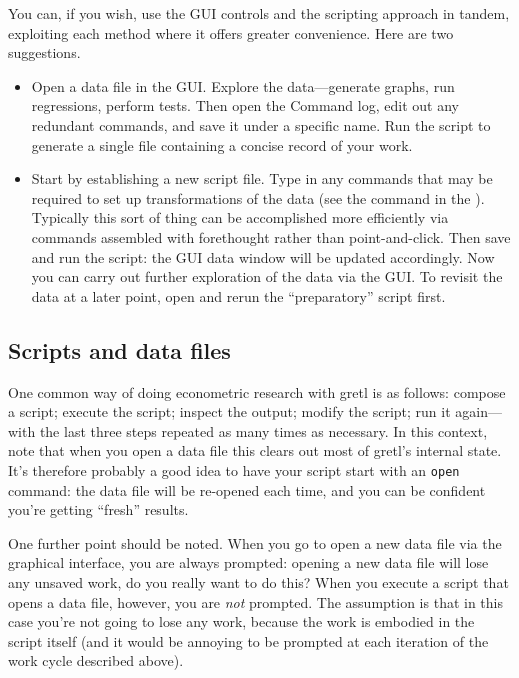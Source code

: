 You can, if you wish, use the GUI controls and the scripting approach
in tandem, exploiting each method where it offers greater convenience.
Here are two suggestions.

\begin{itemize}
\item Open a data file in the GUI.  Explore the data---generate
  graphs, run regressions, perform tests.  Then open the Command log,
  edit out any redundant commands, and save it under a specific name.
  Run the script to generate a single file containing a concise record
  of your work.
\item Start by establishing a new script file.  Type in any commands
  that may be required to set up transformations of the data (see the
   command in the \GCR). Typically this sort of thing can be
  accomplished more efficiently via commands assembled with
  forethought rather than point-and-click. Then save and run the
  script: the GUI data window will be updated accordingly.  Now you
  can carry out further exploration of the data via the GUI.  To
  revisit the data at a later point, open and rerun the
  ``preparatory'' script first.
\end{itemize}

\subsection{Scripts and data files}

One common way of doing econometric research with gretl is as follows:
compose a script; execute the script; inspect the output; modify the
script; run it again---with the last three steps repeated as many
times as necessary.  In this context, note that when you open a data
file this clears out most of gretl's internal state.  It's therefore
probably a good idea to have your script start with an \texttt{open}
command: the data file will be re-opened each time, and you can be
confident you're getting ``fresh'' results.

One further point should be noted.  When you go to open a new data
file via the graphical interface, you are always prompted: opening a
new data file will lose any unsaved work, do you really want to do
this?  When you execute a script that opens a data file, however, you
are \textit{not} prompted.  The assumption is that in this case you're
not going to lose any work, because the work is embodied in the script
itself (and it would be annoying to be prompted at each iteration of
the work cycle described above).   

